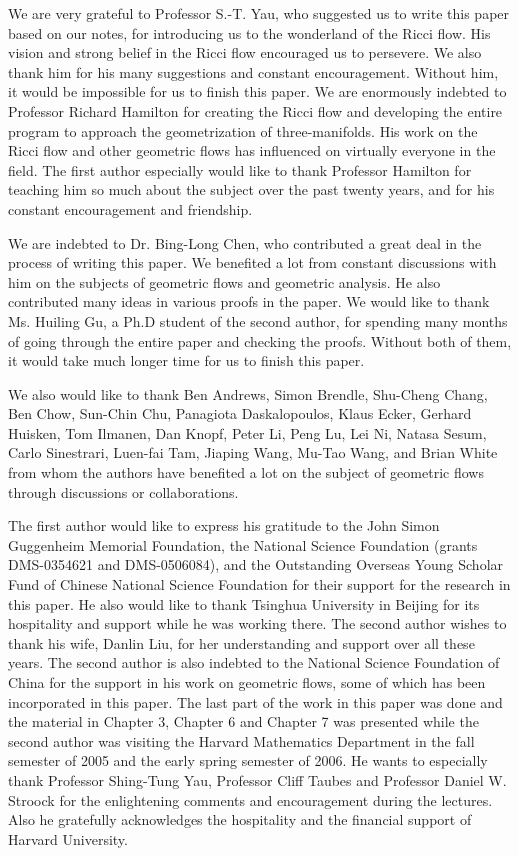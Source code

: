 We are very grateful to Professor S.-T. Yau, who suggested us to
write this paper based on our notes, for introducing us to the
wonderland of the Ricci flow. His vision and strong belief in the
Ricci flow encouraged us to persevere. We also thank him for his
many suggestions and constant encouragement. Without him, it would
be impossible for us to finish this paper. We are enormously
indebted to Professor Richard Hamilton for creating the Ricci flow
and developing the entire program to approach the geometrization
of three-manifolds. His work on the Ricci flow and other geometric
flows has influenced on virtually everyone in the field. The first
author especially would like to thank Professor Hamilton for
teaching him so much about the subject over the past twenty years,
and for his constant encouragement and friendship.

We are indebted to Dr. Bing-Long Chen, who contributed a great
deal in the process of writing this paper. We benefited a lot from
constant discussions with him on the subjects of geometric flows
and geometric analysis. He also contributed many ideas in various
proofs in the paper. We would like to thank Ms. Huiling Gu, a Ph.D
student of the second author, for spending many months of going
through the entire paper and checking the proofs. Without both of
them, it would take much longer time for us to finish this paper.

We also would like to thank Ben Andrews, Simon Brendle, Shu-Cheng
Chang, Ben Chow, Sun-Chin Chu, Panagiota Daskalopoulos, Klaus
Ecker, Gerhard Huisken, Tom Ilmanen, Dan Knopf, Peter Li, Peng Lu,
Lei Ni, Natasa Sesum, Carlo Sinestrari, Luen-fai Tam, Jiaping
Wang, Mu-Tao Wang, and Brian White from whom the authors have
benefited a lot on the subject of geometric flows through
discussions or collaborations.

\enlargethispage{5mm} The first author would like to express his
gratitude to the John Simon Guggenheim Memorial Foundation, the
National Science Foundation (grants DMS-0354621 and DMS-0506084),
and the Outstanding Overseas Young Scholar Fund of Chinese
National Science Foundation for their support for the research in
this paper. He also would like to thank Tsinghua University in
Beijing for its hospitality and support while he was working
there. The second author wishes to thank his wife, Danlin Liu, for
her understanding and support over all these years. The second
author is also indebted to the National Science Foundation of
China for the support in his work on geometric flows, some of
which has been incorporated in this paper. The last part of the
work in this paper was done and the material in Chapter 3, Chapter
6 and Chapter 7 was presented while the second author was visiting
the Harvard Mathematics Department in the fall semester of 2005
and the early spring semester of 2006. He wants to especially
thank Professor Shing-Tung Yau, Professor Cliff Taubes and
Professor Daniel W. Stroock for the enlightening comments and
encouragement during the lectures. Also he gratefully acknowledges
the hospitality and the financial support of Harvard University.

